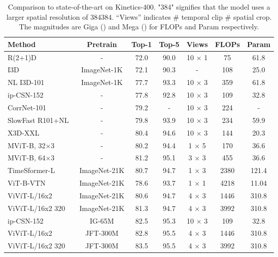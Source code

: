 \documentclass{article}
\newcommand{\demph}[1]{\textcolor[rgb]{0.565,0.565,0.565}{#1}}
\begin{document}
\begin{table}[t]
\caption{Comparison to state-of-the-art on Kinetics-400. "384" signifies that the model uses a larger spatial resolution of 384384. “Views” indicates \# temporal clip  \# spatial crop. The magnitudes are Giga () and Mega () for FLOPs and Param respectively.}
\centering
  \begin{tabular}{l|c|cc|c|cc}
\Xhline{1.0pt}
  Method & Pretrain & Top-1 & Top-5 & Views & FLOPs & Param  \\
  \hline
  R(2+1)D~\cite{tran2018closer} & - & 72.0 & 90.0 & 10 × 1 & 75 & 61.8 \\
  I3D~\cite{carreira2017quo} & ImageNet-1K & 72.1 & 90.3 & - & 108 & 25.0 \\
  NL I3D-101~\cite{wang2018non} & ImageNet-1K & 77.7 & 93.3 & 10 × 3 & 359 & 61.8\\
  ip-CSN-152~\cite{tran2019video} & - & 77.8 & 92.8 & 10 × 3 & 109 & 32.8 \\
  CorrNet-101~\cite{wang2020video} & - & 79.2 & - & 10 × 3 & 224 & - \\
  SlowFast R101+NL~\cite{feichtenhofer2019slowfast} & - & 79.8 & 93.9 & 10 × 3 & 234 & 59.9 \\
  X3D-XXL~\cite{feichtenhofer2020x3d} & - & 80.4 & 94.6 & 10 × 3 & 144 &20.3 \\
  \hline
  MViT-B, 32×3~\cite{fan2021multiscale} & - & 80.2 & 94.4 & 1 × 5 & 170 & 36.6 \\
  MViT-B, 64×3~\cite{fan2021multiscale} & - & 81.2 & 95.1 & 3 × 3 & 455 & 36.6\\
  TimeSformer-L~\cite{timesformer2021} & ImageNet-21K & 80.7 & 94.7 & 1 × 3 & 2380 & 121.4\\
  ViT-B-VTN~\cite{neimark2021VTN} & ImageNet-21K & 78.6 & 93.7 & 1 × 1 &4218 & 11.04\\
  ViViT-L/16x2~\cite{arnab2021vivit} & ImageNet-21K & 80.6 & 94.7 & 4 × 3 &1446 & 310.8\\
  ViViT-L/16x2 320~\cite{arnab2021vivit} & ImageNet-21K & 81.3 & 94.7 & 4 × 3 & 3992 & 310.8\\
\demph{ip-CSN-152~\cite{tran2019video}} & \demph{IG-65M} & \demph{82.5} & \demph{95.3} & \demph{10 × 3} & \demph{109} & \demph{32.8} \\
  \demph{ViViT-L/16x2~\cite{arnab2021vivit}} & \demph{JFT-300M} & \demph{82.8} & \demph{95.5} & \demph{4 × 3} & \demph{1446} & \demph{310.8} \\
  \demph{ViViT-L/16x2 320~\cite{arnab2021vivit}} & \demph{JFT-300M} & \demph{83.5} & \demph{95.5} & \demph{4 × 3} &\demph{3992} & \demph{310.8}\\

\end{tabular}
\end{table}
\end{document}
